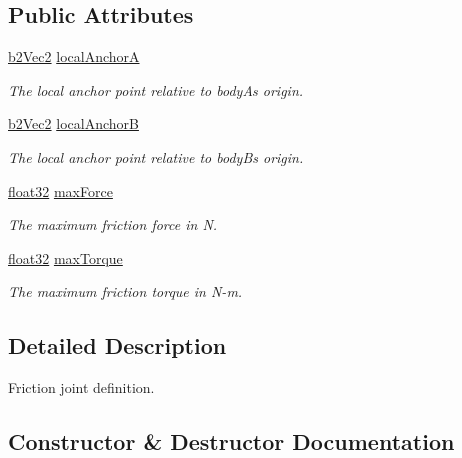 \subsection*{Public Attributes}
\begin{DoxyCompactItemize}
\item 
\mbox{\hyperlink{structb2_vec2}{b2\+Vec2}} \mbox{\hyperlink{structb2_friction_joint_def_a00b246e60ae282a956a42b662993e92a}{local\+AnchorA}}
\begin{DoxyCompactList}\small\item\em The local anchor point relative to bodyA\textquotesingle{}s origin. \end{DoxyCompactList}\item 
\mbox{\hyperlink{structb2_vec2}{b2\+Vec2}} \mbox{\hyperlink{structb2_friction_joint_def_ad6d5a5614a7ac77b13e53fda3e32ed05}{local\+AnchorB}}
\begin{DoxyCompactList}\small\item\em The local anchor point relative to bodyB\textquotesingle{}s origin. \end{DoxyCompactList}\item 
\mbox{\hyperlink{b2_settings_8h_aacdc525d6f7bddb3ae95d5c311bd06a1}{float32}} \mbox{\hyperlink{structb2_friction_joint_def_ad30e97a80790d4ca64bac7a1fa7d1b35}{max\+Force}}
\begin{DoxyCompactList}\small\item\em The maximum friction force in N. \end{DoxyCompactList}\item 
\mbox{\hyperlink{b2_settings_8h_aacdc525d6f7bddb3ae95d5c311bd06a1}{float32}} \mbox{\hyperlink{structb2_friction_joint_def_a61adfb0ee7c0ed4cb8feee8304c16ef6}{max\+Torque}}
\begin{DoxyCompactList}\small\item\em The maximum friction torque in N-\/m. \end{DoxyCompactList}\end{DoxyCompactItemize}


\subsection{Detailed Description}
Friction joint definition. 

\subsection{Constructor \& Destructor Documentation}
\mbox{\label{structb2_friction_joint_def_a40c1092cc8b3b348cdf2f8d445e835e6}} 
